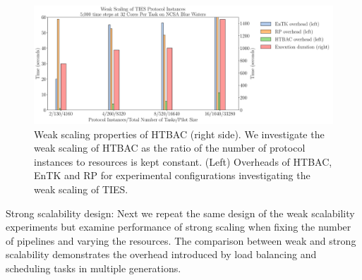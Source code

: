 

\begin{figure}
  \centering
   \includegraphics[width=\columnwidth]{figures/weak_scaling_TIES_instances_5,000_timesteps}
  \caption{Weak scaling properties of HTBAC (right side). We investigate the
  weak scaling of HTBAC as the ratio of the number of protocol instances to
  resources is kept constant. (Left) Overheads of HTBAC, EnTK and RP for
  experimental configurations investigating the weak scaling of TIES.
  }
\label{fig:weak_scaling}
\end{figure}



Strong scalability design: Next we repeat the same design of the weak scalability experiments but examine performance of strong scaling when fixing the number of pipelines and varying the resources. The comparison between weak and strong scalability demonstrates the overhead introduced by load balancing and scheduling tasks in multiple generations.


